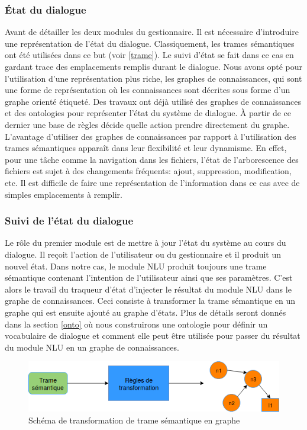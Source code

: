 \subsubsection{État du dialogue}
Avant de détailler les deux modules du gestionnaire. Il est nécessaire d'introduire une représentation de l'état du dialogue. Classiquement, les trames sémantiques ont été utilisées dans ce but (voir \ref{trame}). Le suivi d'état se fait dans ce cas en gardant trace des emplacements remplis durant le dialogue.
Nous avons opté pour l'utilisation d'une représentation plus riche, les graphes de connaissances, qui sont une forme de représentation où les connaissances sont décrites sous forme d'un graphe orienté étiqueté. Des travaux ont déjà utilisé des graphes de connaissances \citep{Stoyanchev2018} et des ontologies \citep{Wessel2019} pour représenter l'état du système de dialogue. À partir de ce dernier une base de règles décide quelle action prendre directement du graphe. L'avantage d'utiliser des graphes de connaissances par rapport à l'utilisation des trames sémantiques apparaît dans leur flexibilité et leur dynamisme. En effet, pour une tâche comme la navigation dans les fichiers, l'état de l'arborescence des fichiers est sujet à des changements fréquents: ajout, suppression, modification, etc. Il est difficile de faire une représentation de l'information dans ce cas avec de simples emplacements à remplir.
\subsubsection{Suivi de l'état du dialogue}
Le rôle du premier module est de mettre à jour l'état du système au cours du dialogue. Il reçoit l'action de l'utilisateur ou du gestionnaire et il produit un nouvel état. Dans notre cas, le module NLU produit toujours une trame sémantique contenant l'intention de l'utilisateur ainsi que ses paramètres. C'est alors le travail du traqueur d'état d'injecter le résultat du module NLU dans le graphe de connaissances. Ceci consiste à transformer la trame sémantique en un graphe qui est ensuite ajouté au graphe d'états. Plus de détails seront donnés dans la section \ref{onto} où nous construirons une ontologie pour définir un vocabulaire de dialogue et comment elle peut être utilisée pour passer du résultat du module NLU en un graphe de connaissances.
\begin{figure}[H] 
	
	\centering
	\includegraphics[width=0.8\linewidth]{images/Conception/DM/Transformer.png}
	\caption{Schéma de transformation de trame sémantique en graphe}
\end{figure}\label{transformer}
